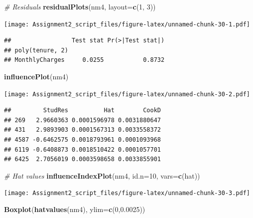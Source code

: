 \documentclass[
]{article}
\newenvironment{Shaded}{\begin{snugshade}}{\end{snugshade}}
\newcommand{\AttributeTok}[1]{\textcolor[rgb]{0.13,0.29,0.53}{#1}}
\newcommand{\CommentTok}[1]{\textcolor[rgb]{0.56,0.35,0.01}{\textit{#1}}}
\newcommand{\DecValTok}[1]{\textcolor[rgb]{0.00,0.00,0.81}{#1}}
\newcommand{\FloatTok}[1]{\textcolor[rgb]{0.00,0.00,0.81}{#1}}
\newcommand{\FunctionTok}[1]{\textcolor[rgb]{0.13,0.29,0.53}{\textbf{#1}}}
\newcommand{\NormalTok}[1]{#1}
\newcommand{\StringTok}[1]{\textcolor[rgb]{0.31,0.60,0.02}{#1}}
\begin{document}
\begin{Shaded}
\begin{Highlighting}[]
\CommentTok{\# Residuals}
\FunctionTok{residualPlots}\NormalTok{(nm4, }\AttributeTok{layout=}\FunctionTok{c}\NormalTok{(}\DecValTok{1}\NormalTok{, }\DecValTok{3}\NormalTok{))}
\end{Highlighting}
\end{Shaded}

\texttt{[image: Assignment2\_script\_files/figure-latex/unnamed-chunk-30-1.pdf]}

\begin{verbatim}
##                 Test stat Pr(>|Test stat|)
## poly(tenure, 2)                           
## MonthlyCharges     0.0255           0.8732
\end{verbatim}

\begin{Shaded}
\begin{Highlighting}[]
\FunctionTok{influencePlot}\NormalTok{(nm4)}
\end{Highlighting}
\end{Shaded}

\texttt{[image: Assignment2\_script\_files/figure-latex/unnamed-chunk-30-2.pdf]}

\begin{verbatim}
##         StudRes          Hat        CookD
## 269   2.9660363 0.0001596978 0.0031880647
## 431   2.9893903 0.0001567313 0.0033558372
## 4587 -0.6462575 0.0018793961 0.0001093968
## 6119 -0.6408873 0.0018510422 0.0001057701
## 6425  2.7056019 0.0003598658 0.0033855901
\end{verbatim}

\begin{Shaded}
\begin{Highlighting}[]
\CommentTok{\# Hat values}
\FunctionTok{influenceIndexPlot}\NormalTok{(nm4, }\AttributeTok{id.n=}\DecValTok{10}\NormalTok{, }\AttributeTok{vars=}\FunctionTok{c}\NormalTok{(}\StringTok{\textquotesingle{}hat\textquotesingle{}}\NormalTok{))}
\end{Highlighting}
\end{Shaded}

\texttt{[image: Assignment2\_script\_files/figure-latex/unnamed-chunk-30-3.pdf]}

\begin{Shaded}
\begin{Highlighting}[]
\FunctionTok{Boxplot}\NormalTok{(}\FunctionTok{hatvalues}\NormalTok{(nm4), }\AttributeTok{ylim=}\FunctionTok{c}\NormalTok{(}\DecValTok{0}\NormalTok{,}\FloatTok{0.0025}\NormalTok{))}
\end{Highlighting}
\end{Shaded}
\end{document}
